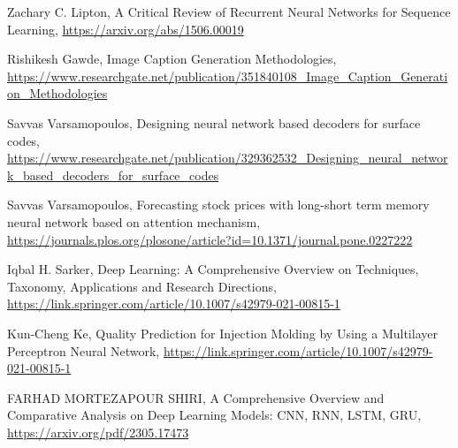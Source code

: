 \documentclass{ieeeojies}
\begin{document}
\begin{thebibliography}{00}
    Zachary C. Lipton,
    A Critical Review of Recurrent Neural Networks for Sequence Learning, \url{https://arxiv.org/abs/1506.00019}
    
    Rishikesh Gawde,
    Image Caption Generation Methodologies, \url{https://www.researchgate.net/publication/351840108_Image_Caption_Generation_Methodologies}
    
    Savvas Varsamopoulos,
    Designing neural network based decoders for surface codes, \url{https://www.researchgate.net/publication/329362532_Designing_neural_network_based_decoders_for_surface_codes}

    Savvas Varsamopoulos,
    Forecasting stock prices with long-short term memory neural network based on attention mechanism,
    \url{https://journals.plos.org/plosone/article?id=10.1371/journal.pone.0227222}

    Iqbal H. Sarker,
    Deep Learning: A Comprehensive Overview on Techniques, Taxonomy, Applications and Research Directions,
    \url{https://link.springer.com/article/10.1007/s42979-021-00815-1}

    Kun-Cheng Ke,
    Quality Prediction for Injection Molding by Using a Multilayer Perceptron Neural Network,
    \url{https://link.springer.com/article/10.1007/s42979-021-00815-1}

    FARHAD MORTEZAPOUR SHIRI,
    A Comprehensive Overview and Comparative Analysis on Deep Learning Models: CNN, RNN, LSTM, GRU,
    \url{https://arxiv.org/pdf/2305.17473}

\end{thebibliography}

\EOD
\end{document}
